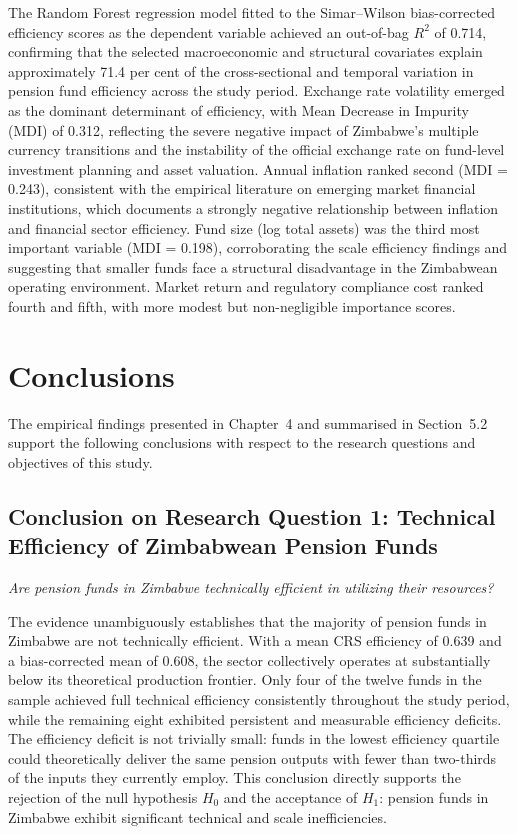 \documentclass[12pt,a4paper]{article}
\begin{document}
The Random Forest regression model fitted to the Simar--Wilson bias-corrected efficiency scores as the dependent variable achieved an out-of-bag $R^2$ of 0.714, confirming that the selected macroeconomic and structural covariates explain approximately 71.4 per cent of the cross-sectional and temporal variation in pension fund efficiency across the study period. Exchange rate volatility emerged as the dominant determinant of efficiency, with Mean Decrease in Impurity (MDI) of 0.312, reflecting the severe negative impact of Zimbabwe's multiple currency transitions and the instability of the official exchange rate on fund-level investment planning and asset valuation. Annual inflation ranked second (MDI = 0.243), consistent with the empirical literature on emerging market financial institutions, which documents a strongly negative relationship between inflation and financial sector efficiency. Fund size (log total assets) was the third most important variable (MDI = 0.198), corroborating the scale efficiency findings and suggesting that smaller funds face a structural disadvantage in the Zimbabwean operating environment. Market return and regulatory compliance cost ranked fourth and fifth, with more modest but non-negligible importance scores.

\section{Conclusions}

The empirical findings presented in Chapter~4 and summarised in Section~5.2 support the following conclusions with respect to the research questions and objectives of this study.

\subsection{Conclusion on Research Question 1: Technical Efficiency of Zimbabwean Pension Funds}

\textit{Are pension funds in Zimbabwe technically efficient in utilizing their resources?}

The evidence unambiguously establishes that the majority of pension funds in Zimbabwe are not technically efficient. With a mean CRS efficiency of 0.639 and a bias-corrected mean of 0.608, the sector collectively operates at substantially below its theoretical production frontier. Only four of the twelve funds in the sample achieved full technical efficiency consistently throughout the study period, while the remaining eight exhibited persistent and measurable efficiency deficits. The efficiency deficit is not trivially small: funds in the lowest efficiency quartile could theoretically deliver the same pension outputs with fewer than two-thirds of the inputs they currently employ. This conclusion directly supports the rejection of the null hypothesis $H_0$ and the acceptance of $H_1$: pension funds in Zimbabwe exhibit significant technical and scale inefficiencies.
\end{document}

